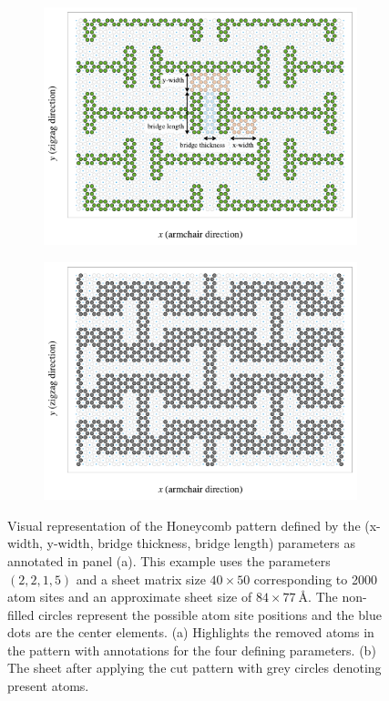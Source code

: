 \begin{figure}[!htb]
  \centering
  \begin{subfigure}[t]{0.48\textwidth}
      \centering
      \includegraphics[width=\textwidth]{figures/system/honeycomb_inverse.pdf}
      \caption{}
      \label{fig:honeycomb_a}
    \end{subfigure}
    \hfill
    \begin{subfigure}[t]{0.48\textwidth}
      \centering
      \includegraphics[width=\textwidth]{figures/system/honeycomb_pattern.pdf}
      \caption{}
      \label{fig:honeycomb_b}
  \end{subfigure}
  \hfill
     \caption{Visual representation of the Honeycomb pattern defined by the (x-width, y-width, bridge thickness, bridge length) parameters as annotated in panel (a). This example uses the parameters $(2,2,1,5)$ and a sheet matrix size $40 \times 50$ corresponding to 2000 atom sites and an approximate sheet size of $84 \times \SI{77}{\text{Å}}$. The non-filled circles represent the possible atom site positions and the blue dots are the center elements. (a) Highlights the removed atoms in the pattern with annotations for the four defining parameters. (b) The sheet after applying the cut pattern with grey circles denoting present atoms. }
     \label{fig:honeycomb}
\end{figure}


